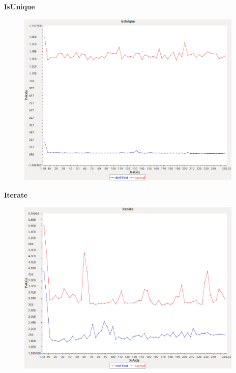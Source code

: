 \noindent\textbf{IsUnique}

\begin{figure}[h]
\centering
\includegraphics[width=\textwidth]{graphs/sequence/isUnique}
\end{figure}
\pagebreak

\noindent\textbf{Iterate}

\begin{figure}[h]
\centering
\includegraphics[width=\textwidth]{graphs/sequence/Iterate}
\end{figure}
\pagebreak

